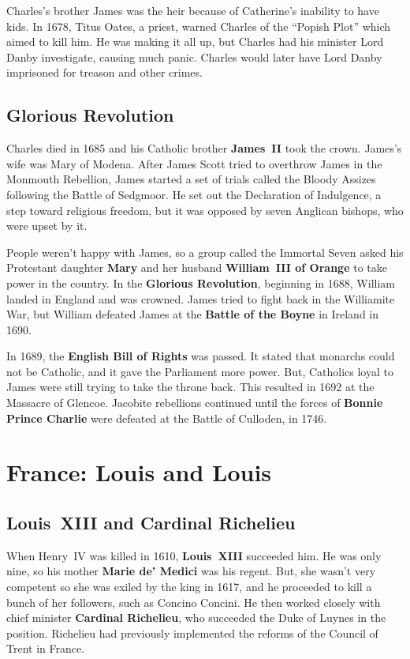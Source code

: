 Charles's brother James was the heir because of Catherine's inability to have kids.
In 1678, Titus Oates, a priest, warned Charles of the ``Popish Plot'' which aimed to kill him.
He was making it all up, but Charles had his minister Lord Danby investigate, causing much panic.
Charles would later have Lord Danby imprisoned for treason and other crimes.

\subsection*{Glorious Revolution}

Charles died in 1685 and his Catholic brother \textbf{James~II} took the crown.
James's wife was Mary of Modena.
After James Scott tried to overthrow James in the Monmouth Rebellion,
James started a set of trials called the Bloody Assizes following the Battle of Sedgmoor.
He set out the Declaration of Indulgence, a step toward religious freedom,
but it was opposed by seven Anglican bishops, who were upset by it.

People weren't happy with James,
so a group called the Immortal Seven asked his Protestant daughter
\textbf{Mary} and her husband \textbf{William~III of Orange} to take power in the country.
In the \textbf{Glorious Revolution}, beginning in 1688, William landed in England and was crowned.
James tried to fight back in the Williamite War,
but William defeated James at the \textbf{Battle of the Boyne} in Ireland in 1690.

In 1689, the \textbf{English Bill of Rights} was passed.
It stated that monarchs could not be Catholic, and it gave the Parliament more power.
But, Catholics loyal to James were still trying to take the throne back.
This resulted in 1692 at the Massacre of Glencoe.
Jacobite rebellions continued until the forces of
\textbf{Bonnie Prince Charlie} were defeated at the Battle of Culloden, in 1746.

\section{France: Louis and Louis}

\subsection*{Louis~XIII and Cardinal Richelieu}

When Henry~IV was killed in 1610, \textbf{Louis~XIII} succeeded him.
He was only nine, so his mother \textbf{Marie de' Medici} was his regent.
But, she wasn't very competent so she was exiled by the king in 1617,
and he proceeded to kill a bunch of her followers, such as Concino Concini.
He then worked closely with chief minister \textbf{Cardinal Richelieu},
who succeeded the Duke of Luynes in the position.
Richelieu had previously implemented the reforms of the Council of Trent in France.

